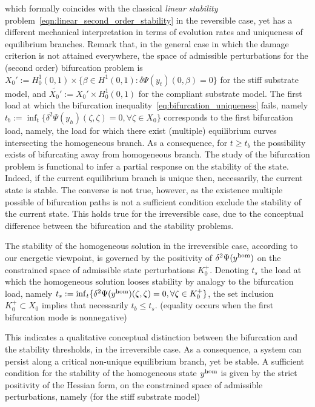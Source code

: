 which formally coincides with the classical \emph{linear stability} problem~\eqref{eqn:linear_second_order_stability} in the reversible case, yet has a different mechanical interpretation in terms of evolution rates and uniqueness of equilibrium branches.
Remark that, in the general case in which the damage criterion is not attained everywhere, the space of admissible perturbations for the (second order) bifurcation problem is $X_0':=H^1_0(0, 1) \times \{ \beta \in H^1(0, 1) : \delta\Psi(y_t)(0, \beta) = 0 \}$ for the stiff substrate model, and $\widetilde{X_0'}:=X_0'\times H^1_0(0,1)$ for the compliant substrate model. 
The first load at which the bifurcation inequality~\eqref{eq:bifurcation_uniqueness} fails, namely $t_b:=\inf_t \{\delta^2 \Psi(y_h)(\zeta, \zeta) =0, \forall \zeta \in X_0 \}$ corresponds to the first  bifurcation load, namely, the load for which there exist (multiple) equilibrium curves intersecting the homogeneous branch. As a consequence, for $t\geq t_b$  the possibility exists of bifurcating away from homogeneous branch. The study of the bifurcation problem is functional to infer a partial response on the stability of the state. Indeed, if the current equilibrium branch is unique then, necessarily, the current state is stable. The converse is not true, however, as the existence multiple possible of bifurcation paths is not a sufficient condition exclude the stability of the current state. This holds true for the irreversible case, due to the conceptual difference between the bifurcation and the stability problems.

The stability of the homogeneous solution in the irreversible case, according to our energetic viewpoint, is governed by the positivity of $\delta^2 \Psi(y^{\text{hom}})$ on the constrained space of admissible state perturbations $K^+_0$.
Denoting $t_s$ the load at which the homogeneous solution looses stability by analogy to the bifurcation load, namely $t_s: = \inf_t \{\delta^2 \Psi(y^{\text{hom}})(\zeta, \zeta) =0, \forall \zeta \in K^+_0 \}$, the set inclusion $K^+_0 \subset X_0$ implies that necessarily $t_b \leq t_s$. (equality occurs when the first bifurcation mode is nonnegative)

This indicates a qualitative conceptual distinction between the bifurcation and the stability thresholds, in the irreversible case. As a consequence, a system can persist along a critical non-unique equilibrium branch, yet be stable. 
A sufficient condition for the stability of the homogeneous state $y^{\text{hom}}$ is given by the strict positivity  of the Hessian form, on the constrained space of admissible perturbations, namely (for the stiff substrate model)

